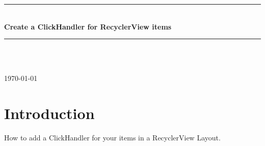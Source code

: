 \documentclass[12pt]{article} %
\begin{document}

\begin{titlepage}

\newcommand{\HRule}{\rule{\linewidth}{0.5mm}} %

\center %

\HRule \\[0.4cm]
{ \huge \bfseries Create a ClickHandler for RecyclerView items }\\[0.4cm] %
\HRule \\[1.5cm]

\begin{minipage}{0.4\textwidth}
\end{minipage}\\[4cm]

{\large \today}\\[3cm] %


\vfill %

\end{titlepage}


\tableofcontents %

\newpage %


\section{Introduction} %

How to add a ClickHandler for your items in a RecyclerView Layout.
\end{document}
